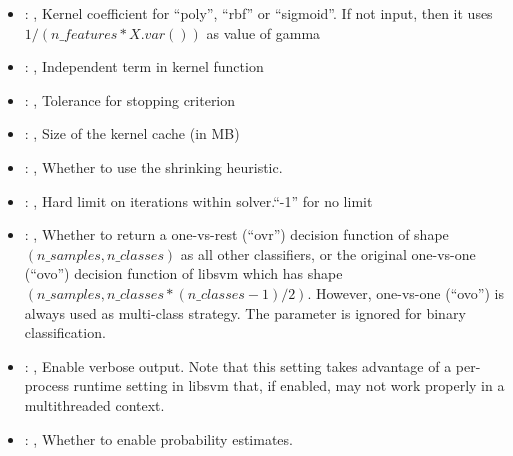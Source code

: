 \begin{itemize}
    \item {}: , 
      Kernel coefficient for ``poly'', ``rbf'' or ``sigmoid''. If not input, then it uses
      $1 / (n\_features * X.var())$ as value of gamma

    \item {}: , 
      Independent term in kernel function

    \item {}: , 
      Tolerance for stopping criterion

    \item {}: , 
      Size of the kernel cache (in MB)

    \item {}: , 
      Whether to use the shrinking heuristic.

    \item {}: , 
      Hard limit on iterations within solver.``-1'' for no limit

    \item {}: , 
      Whether to return a one-vs-rest (``ovr'') decision function of shape $(n\_samples, n\_classes)$
      as                                                            all other classifiers, or the
      original one-vs-one (``ovo'') decision function of libsvm which has
      shape $(n\_samples, n\_classes * (n\_classes - 1) / 2)$. However, one-vs-one (``ovo'') is always
      used as                                                            multi-class strategy. The
      parameter is ignored for binary classification.

    \item {}: , 
      Enable verbose output. Note that this setting takes advantage
      of a per-process runtime setting in libsvm that, if enabled, may not
      work properly in a multithreaded context.

    \item {}: , 
      Whether to enable probability estimates.


\end{itemize}
